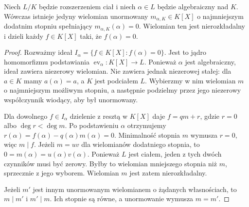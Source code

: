 \begin{lemat}
\label{aa:lem:minimal-polynomial}
Niech $L/K$ będzie rozszerzeniem ciał i niech
$\alpha\in L$ będzie algebraiczny nad $K$. Wówczas istnieje
jedyny wielomian unormowany $m_{\alpha,K}\in K[X]$
o najmniejszym dodatnim stopniu spełniający
$m_{\alpha,K}(\alpha)=0$. Wielomian ten jest
nierozkładalny i dzieli każdy $f\in K[X]$
taki, że $f(\alpha)=0$.
\end{lemat}
\begin{proof}
Rozważmy ideał
$I_\alpha=\{f\in K[X]:f(\alpha)=0\}$.
Jest to jądro homomorfizmu podstawiania
$\operatorname{ev}_\alpha:K[X]\to L$.
Ponieważ $\alpha$ jest algebraiczny, ideał zawiera
niezerowy wielomian. Nie zawiera jednak niezerowej
stałej: dla $a\in K$ mamy $a(\alpha)=a$, a $K$ jest
podciałem $L$. Wybierzmy w nim wielomian $m$
o najmniejszym możliwym stopniu, a następnie podzielmy
przez jego niezerowy współczynnik wiodący, aby był unormowany.

Dla dowolnego $f\in I_\alpha$ dzielenie z resztą
w $K[X]$ daje $f=qm+r$, gdzie $r=0$ albo
$\deg r<\deg m$. Po podstawieniu $\alpha$
otrzymujemy $r(\alpha)=f(\alpha)-q(\alpha)m(\alpha)=0$.
Minimalność stopnia $m$ wymusza $r=0$, więc $m\mid f$.
Jeżeli $m=uv$ dla wielomianów dodatniego stopnia,
to $0=m(\alpha)=u(\alpha)v(\alpha)$.
Ponieważ $L$ jest ciałem, jeden z tych dwóch czynników
musi być zerowy. Byłby to wielomian mniejszego stopnia
niż $m$, sprzecznie z jego wyborem. Wielomian $m$ jest
zatem nierozkładalny.

Jeżeli $m'$ jest innym unormowanym wielomianem o żądanych
własnościach, to $m\mid m'$ i $m'\mid m$.
Ich stopnie są równe, a unormowanie wymusza $m=m'$.
\end{proof}

